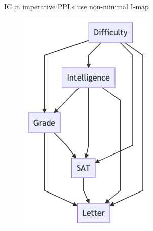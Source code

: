\documentclass{beamer}
\begin{document}
\appendix

\begin{frame}[fragile]{IC in imperative PPLs use non-minimal I-map}
\begin{minipage}{0.4\linewidth}
    \begin{figure}
        \centering
        \includegraphics[width=\linewidth]{figures/student-network-smc-ic.png}
    \end{figure}

\end{minipage}
\end{frame}
\end{document}
